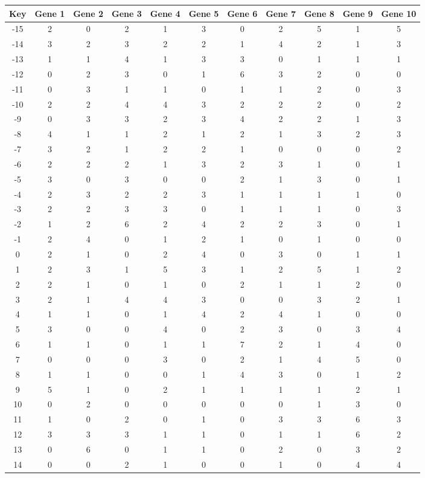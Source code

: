 \begin{tabular}{|c|c|c|c|c|c|c|c|c|c|c|}
\hline
Key & Gene 1 & Gene 2 & Gene 3 & Gene 4 & Gene 5 & Gene 6 & Gene 7 & Gene 8 & Gene 9 & Gene 10 \\
\hline
-15 & 2 & 0 & 2 & 1 & 3 & 0 & 2 & 5 & 1 & 5 \\
-14 & 3 & 2 & 3 & 2 & 2 & 1 & 4 & 2 & 1 & 3 \\
-13 & 1 & 1 & 4 & 1 & 3 & 3 & 0 & 1 & 1 & 1 \\
-12 & 0 & 2 & 3 & 0 & 1 & 6 & 3 & 2 & 0 & 0 \\
-11 & 0 & 3 & 1 & 1 & 0 & 1 & 1 & 2 & 0 & 3 \\
-10 & 2 & 2 & 4 & 4 & 3 & 2 & 2 & 2 & 0 & 2 \\
-9 & 0 & 3 & 3 & 2 & 3 & 4 & 2 & 2 & 1 & 3 \\
-8 & 4 & 1 & 1 & 2 & 1 & 2 & 1 & 3 & 2 & 3 \\
-7 & 3 & 2 & 1 & 2 & 2 & 1 & 0 & 0 & 0 & 2 \\
-6 & 2 & 2 & 2 & 1 & 3 & 2 & 3 & 1 & 0 & 1 \\
-5 & 3 & 0 & 3 & 0 & 0 & 2 & 1 & 3 & 0 & 1 \\
-4 & 2 & 3 & 2 & 2 & 3 & 1 & 1 & 1 & 1 & 0 \\
-3 & 2 & 2 & 3 & 3 & 0 & 1 & 1 & 1 & 0 & 3 \\
-2 & 1 & 2 & 6 & 2 & 4 & 2 & 2 & 3 & 0 & 1 \\
-1 & 2 & 4 & 0 & 1 & 2 & 1 & 0 & 1 & 0 & 0 \\
0 & 2 & 1 & 0 & 2 & 4 & 0 & 3 & 0 & 1 & 1 \\
1 & 2 & 3 & 1 & 5 & 3 & 1 & 2 & 5 & 1 & 2 \\
2 & 2 & 1 & 0 & 1 & 0 & 2 & 1 & 1 & 2 & 0 \\
3 & 2 & 1 & 4 & 4 & 3 & 0 & 0 & 3 & 2 & 1 \\
4 & 1 & 1 & 0 & 1 & 4 & 2 & 4 & 1 & 0 & 0 \\
5 & 3 & 0 & 0 & 4 & 0 & 2 & 3 & 0 & 3 & 4 \\
6 & 1 & 1 & 0 & 1 & 1 & 7 & 2 & 1 & 4 & 0 \\
7 & 0 & 0 & 0 & 3 & 0 & 2 & 1 & 4 & 5 & 0 \\
8 & 1 & 1 & 0 & 0 & 1 & 4 & 3 & 0 & 1 & 2 \\
9 & 5 & 1 & 0 & 2 & 1 & 1 & 1 & 1 & 2 & 1 \\
10 & 0 & 2 & 0 & 0 & 0 & 0 & 0 & 1 & 3 & 0 \\
11 & 1 & 0 & 2 & 0 & 1 & 0 & 3 & 3 & 6 & 3 \\
12 & 3 & 3 & 3 & 1 & 1 & 0 & 1 & 1 & 6 & 2 \\
13 & 0 & 6 & 0 & 1 & 1 & 0 & 2 & 0 & 3 & 2 \\
14 & 0 & 0 & 2 & 1 & 0 & 0 & 1 & 0 & 4 & 4 \\
\hline
\end{tabular}